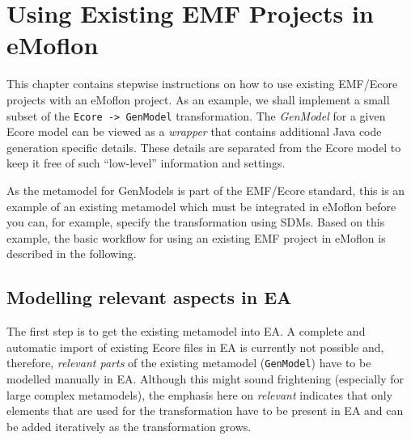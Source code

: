 \section{Using Existing EMF Projects in eMoflon}
\label{sec : Ecore2GenModel}
	
This chapter contains stepwise instructions on how to use existing \mbox{EMF}/\-Ecore projects with an eMoflon project. 
As an example, we shall implement a small subset of the \texttt{Ecore -> GenModel} transformation. 
The \emph{GenModel} for a given Ecore model can be viewed as a \emph{wrapper} that contains additional Java code generation specific details.
These details are separated from the Ecore model to keep it free of such ``low-level'' information and settings.

As the metamodel for \textsf{GenModels} is part of the EMF/Ecore standard, this is an example of an existing metamodel which must be integrated in eMoflon before you can, for example, specify the transformation using SDMs. 
Based on this example, the basic workflow for using an existing EMF project in eMoflon is described in the following.

\subsection{Modelling relevant aspects in EA}
\label{sec: Set Up the Example}

The first step is to get the existing metamodel into EA.
A complete and automatic import of existing Ecore files in EA is currently not possible and, therefore, \emph{relevant parts} of the existing metamodel (\texttt{GenModel}) have to be modelled manually in EA.
Although this might sound frightening (especially for large complex metamodels), the emphasis here on \emph{relevant} indicates that only elements that are used for the transformation have to be present in EA and can be added iteratively as the transformation grows.


